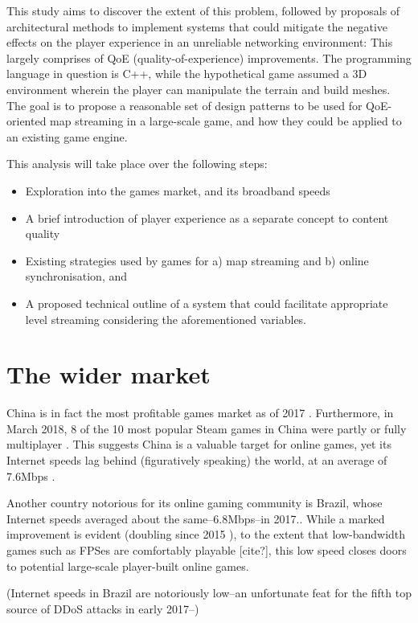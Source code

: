 \documentclass{scrartcl}
\begin{document}
This study aims to discover the extent of this problem, followed by proposals of architectural methods to implement systems that could mitigate the negative effects on the player experience in an unreliable networking environment: This largely comprises of QoE (quality-of-experience) improvements. The programming language in question is C++, while the hypothetical game assumed a 3D environment wherein the player can manipulate the terrain and build meshes. The goal is to propose a reasonable set of design patterns to be used for QoE-oriented map streaming in a large-scale game, and how they could be applied to an existing game engine.

This analysis will take place over the following steps:
\begin{itemize}
\item Exploration into the games market, and its broadband speeds
\item A brief introduction of player experience as a separate concept to content quality
\item Existing strategies used by games for a) map streaming and b) online synchronisation, and
\item A proposed technical outline of a system that could facilitate appropriate level streaming considering the aforementioned variables.
\end{itemize}

\section{The wider market}
China is in fact the most profitable games market as of 2017 \cite{chinamarket}. Furthermore, in March 2018, 8 of the 10 most popular Steam games in China were partly or fully multiplayer \cite{steamchina}. This suggests China is a valuable target for online games, yet its Internet speeds lag behind (figuratively speaking) the world, at an average of 7.6Mbps \cite{webspeeds}.

Another country notorious for its online gaming community is Brazil, whose Internet speeds averaged about the same--6.8Mbps--in 2017.\cite{webspeeds}. While a marked improvement is evident (doubling since 2015 \cite{webspeeds2015}), to the extent that low-bandwidth games such as FPSes are comfortably playable [cite?], this low speed closes doors to potential large-scale player-built online games.

(Internet speeds in Brazil are notoriously low--an unfortunate feat for the fifth top source of DDoS attacks in early 2017\cite{websecurity}--)
\end{document}
